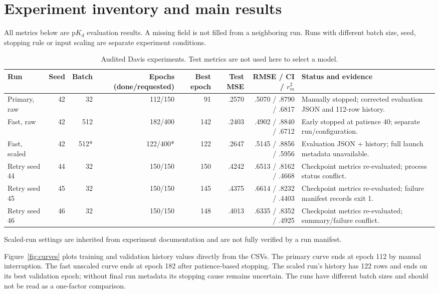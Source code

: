 \section{Experiment inventory and main results}
All metrics below are p$K_d$ evaluation results. A missing field is not filled from a neighboring run. Runs with different batch size, seed, stopping rule or input scaling are separate experiment conditions.

\begin{table}[tb]\centering\small
\caption{Audited Davis experiments. Test metrics are not used here to select a model.}
\label{tab:results}
\begin{tabularx}{\linewidth}{lrrrrrrX}
\toprule Run & Seed & Batch & Epochs (done/requested) & Best epoch & Test MSE & RMSE / CI / $r_m^2$ & Status and evidence \\
\midrule
Primary, raw & 42 & 32 & 112/150 & 91 & .2570 & .5070 / .8790 / .6817 & Manually stopped; corrected evaluation JSON and 112-row history. \\
Fast, raw & 42 & 512 & 182/400 & 142 & .2403 & .4902 / .8840 / .6712 & Early stopped at patience 40; separate run/configuration. \\
Fast, scaled & 42 & 512* & 122/400* & 122 & .2647 & .5145 / .8856 / .5956 & Evaluation JSON + history; full launch metadata unavailable. \\
Retry seed 44 & 44 & 32 & 150/150 & 150 & .4242 & .6513 / .8162 / .4668 & Checkpoint metrics re-evaluated; process status conflict. \\
Retry seed 45 & 45 & 32 & 150/150 & 145 & .4375 & .6614 / .8232 / .4403 & Checkpoint metrics re-evaluated; failure manifest records exit 1. \\
Retry seed 46 & 46 & 32 & 150/150 & 148 & .4013 & .6335 / .8352 / .4925 & Checkpoint metrics re-evaluated; summary/failure conflict. \\
\bottomrule
\end{tabularx}
\end{table}
\noindent\footnotesize *Scaled-run settings are inherited from experiment documentation and are not fully verified by a run manifest.\normalsize

Figure~\ref{fig:curves} plots training and validation history values directly from the CSVs. The primary curve ends at epoch 112 by manual interruption. The fast unscaled curve ends at epoch 182 after patience-based stopping. The scaled run’s history has 122 rows and ends on its best validation epoch; without final run metadata its stopping cause remains uncertain. The runs have different batch sizes and should not be read as a one-factor comparison.

